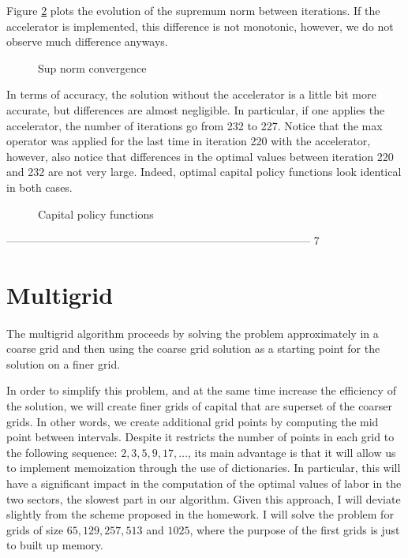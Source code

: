 \documentclass[11pt,a4paper]{article}
\newcommand{\goodgap}{ \hspace{\subfigtopskip} \hspace{\subfigbottomskip}}
\begin{document}
Figure \ref{VFI_convergence} plots the evolution of the supremum norm between iterations. If the accelerator is implemented, this difference is not monotonic, however, we do not observe much difference anyways.
\begin{figure}[h]
\centering
{}
\goodgap
{}
\caption{Sup norm convergence}
\label{VFI_convergence}
\end{figure}

In terms of accuracy, the solution without the accelerator is a little bit more accurate, but differences are almost negligible. In particular, if one applies the accelerator, the number of iterations go from 232 to 227. Notice that the max operator was applied for the last time in iteration 220 with the accelerator, however, also notice that differences in the optimal values between iteration 220 and 232 are not very large. Indeed, optimal capital policy functions look identical in both cases.

\vspace{0.5cm}\begin{figure}[h]
\centering
{}
\goodgap
{}
\caption{Capital policy functions}
\label{VFI_convergence}
\end{figure}

-----------------------------------------------------------------------------------
7

\section{Multigrid}
\paragraph{} The multigrid algorithm proceeds by solving the problem approximately in a coarse grid and then using the coarse grid solution as a starting point for the solution on a finer grid.

In order to simplify this problem, and at the same time increase the efficiency of the solution, we will create finer grids of capital that are superset of the coarser grids. In other words, we create additional grid points by computing the mid point between intervals. Despite it restricts the number of points in each grid to the following sequence: $2,3,5,9,17,\dots$, its main advantage is that it will allow us to implement memoization through the use of dictionaries. In particular, this will have a significant impact in the computation of the optimal values of labor in the two sectors, the slowest part in our algorithm. Given this approach, I will deviate slightly from the scheme proposed in the homework. I will solve the problem for grids of size $65, 129, 257, 513$ and $1025$, where the purpose of the first grids is just to built up memory.
\end{document}
